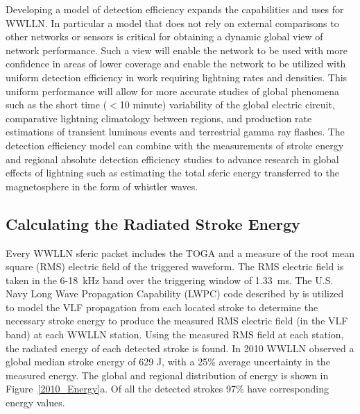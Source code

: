 \documentclass[draft,ras]{agutex}
\begin{document}
\begin{article}
Developing a model of detection efficiency expands the capabilities and uses for WWLLN. In particular a model that does not rely on external comparisons to other networks or sensors is critical for obtaining a dynamic global view of network performance. Such a view will enable the network to be used with more confidence in areas of lower coverage and enable the network to be utilized with uniform detection efficiency in work requiring lightning rates and densities. This uniform performance will allow for more accurate studies of global phenomena such as the short time ($<$10 minute) variability of the global electric circuit, comparative lightning climatology between regions, and production rate estimations of transient luminous events and terrestrial gamma ray flashes. The detection efficiency model can combine with the measurements of stroke energy and regional absolute detection efficiency studies to advance research in global effects of lightning such as estimating the total sferic energy transferred to the magnetosphere in the form of whistler waves.

\subsection{Calculating the Radiated Stroke Energy}

Every WWLLN sferic packet includes the TOGA and a measure of the root mean square (RMS) electric field of the triggered waveform. The RMS electric field is taken in the 6-18~kHz band over the triggering window of 1.33~ms. The U.S. Navy Long Wave Propagation Capability (LWPC) code described by \citet{Ferguson1998} is utilized to model the VLF propagation from each located stroke to determine the necessary stroke energy to produce the measured RMS electric field (in the VLF band) at each WWLLN station. Using the measured RMS field at each station, the radiated energy of each detected stroke is found. In 2010 WWLLN observed a global median stroke energy of 629 J, with a 25\% average uncertainty in the measured energy. The global and regional distribution of energy is shown in Figure~\ref{2010_Energy}a. Of all the detected strokes 97\% have corresponding energy values. \citep{Hutchins2012}


\end{article}
\end{document}
